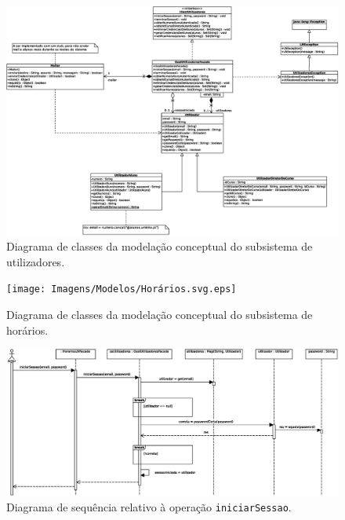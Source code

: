 \documentclass[12pt, a4paper]{article}
\begin{document}
\begingroup
    \begin{landscape}
        \vspace*{\fill}

        \begin{figure}[H]
            \centering
            \includegraphics[width=\textwidth]{Imagens/Modelos/Utilizadores.svg.eps}
            \caption{
                Diagrama de classes da modelação conceptual do subsistema de utilizadores.
            }
        \end{figure}

        \vspace*{\fill}
        \pagebreak
        \vspace*{\fill}

        \begin{figure}[H]
            \centering
            \texttt{[image: Imagens/Modelos/Horários.svg.eps]}
            \caption{
                Diagrama de classes da modelação conceptual do subsistema de horários.
            }
        \end{figure}

        \vspace*{\fill}
        \pagebreak
        \vspace*{\fill}

        \begin{figure}[H]
            \centering
            \includegraphics[scale=0.8]{Imagens/Modelos/iniciarSessao.svg.eps}
            \caption{
                Diagrama de sequência relativo à operação \texttt{iniciarSessao}.
            }
        \end{figure}


\end{landscape}
\end{document}
